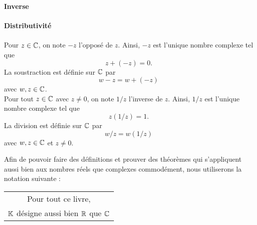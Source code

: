 \documentclass[12pt]{book}
\theoremstyle{plain}
\begin{document}
\noindent
\textbf{Inverse}\\
\\

\noindent
\textbf{Distributivité}\\
\\





Pour $z \in\mathbb{C}$, on note $-z$ l'opposé de $z$. Ainsi, $-z$ est l'unique nombre complexe tel que
\begin{equation*}
    z+(-z) =0\mathrm{.}
\end{equation*}
La soustraction est définie sur $\mathbb{C}$ par
\begin{equation*}
    w-z=w+(-z)
\end{equation*}
avec $w,z\in\mathbb{C}$.\\
\indent{}Pour tout $z\in\mathbb{C}$ avec $z\ne 0$, on note $1/z$ l'inverse de $z$. Ainsi, $1/z$ est l'unique nombre complexe tel que
\begin{equation*}
    z(1/z)=1\mathrm{.}
\end{equation*}
La division est définie sur $\mathbb{C}$ par
\begin{equation*}
    w/z = w(1/z)
\end{equation*}
avec $w,z\in\mathbb{C}$ et $z\ne 0$.

\indent{}Afin de pouvoir faire des définitions et prouver des théorèmes qui s'appliquent aussi bien aux nombres réels que complexes commodément, nous utiliserons la notation suivante :

\begin{center}
    \begin{tabular}{|c|}
        \hline
        Pour tout ce livre,   \\
        $\mathbb{K}$ désigne aussi bien $\mathbb{R}$ que $\mathbb{C}$   \\
        \hline
    \end{tabular}
\end{center}
\end{document}
